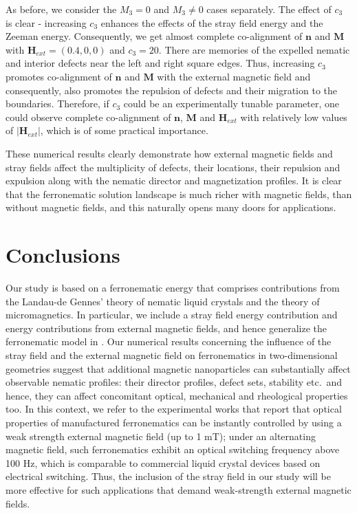 \documentclass{article}
\def \Mvec{\mathbf{M}}
\def\nvec{\mathbf{n}}
\def\Hvec{\mathbf{H}}
\begin{document}
As before, we consider the $M_3=0$ and $M_3 \neq 0$ cases separately. The effect of $c_3$ is clear - increasing $c_3$ enhances the effects of the stray field energy and the Zeeman energy. Consequently, we get almost complete co-alignment of $\nvec$ and $\Mvec$ with $\Hvec_{ext} = (0.4,0,0)$ and $c_3=20$. There are memories of the expelled nematic and interior defects near the left and right square edges. Thus, increasing $c_3$ promotes co-alignment of $\nvec$ and $\Mvec$ with the external magnetic field and consequently, also promotes the repulsion of defects and their migration to the boundaries. Therefore, if $c_3$ could be an experimentally tunable parameter, one could observe complete co-alignment of $\nvec$, $\Mvec$ and $\Hvec_{ext}$ with relatively low values of $|\Hvec_{ext}|$, which is of some practical importance. 

These numerical results clearly demonstrate how external magnetic fields and stray fields affect the multiplicity of defects, their locations, their repulsion and expulsion along with the nematic director and magnetization profiles. It is clear that the ferronematic solution landscape is much richer with magnetic fields, than without magnetic fields, and this naturally opens many doors for applications.





\section{Conclusions}\label{sec:6}
\label{sec:conclusions}
Our study is based on a ferronematic energy that comprises contributions from the Landau-de Gennes' theory of nematic liquid crystals and the theory of micromagnetics. In particular, we include a stray field energy contribution and energy contributions from external magnetic fields, and hence generalize the ferronematic model in \cite{Bisht2020}. Our numerical results concerning the influence of the stray field and the external magnetic field on ferronematics in two-dimensional geometries 
suggest that additional magnetic nanoparticles  can substantially affect observable nematic profiles: their director profiles, defect sets, stability etc.\ and hence, they can affect concomitant optical, mechanical and rheological properties too. 
In this context, we refer to the experimental works \cite{chen1983observation, Mertelj} that report that optical properties of manufactured ferronematics can be instantly controlled by using a weak strength external magnetic field (up to 1 mT); under an alternating magnetic field, such ferronematics exhibit an optical switching frequency above 100 Hz, which is comparable to commercial liquid crystal devices based on electrical switching. Thus, the inclusion of the stray field in our study will be more effective for such applications that demand weak-strength external magnetic fields. 
\end{document}

